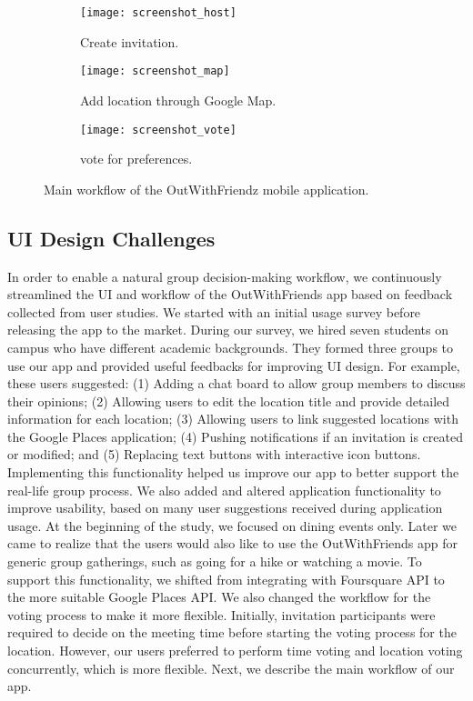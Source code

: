 \begin{figure}
\centering
\begin{subfigure}{.33\textwidth}
  \centering
  \texttt{[image: screenshot\_host]}
  \caption{Create invitation.}
  \label{fig:screenshot_host}
\end{subfigure}%
\begin{subfigure}{.33\textwidth}
  \centering
  \texttt{[image: screenshot\_map]}
  \caption{Add location through Google Map.}
  \label{fig:screenshot_map}
\end{subfigure}
\begin{subfigure}{.33\textwidth}
  \centering
  \texttt{[image: screenshot\_vote]}
  \caption{ vote for preferences.}
  \label{fig:screenshot_vote}
\end{subfigure}
\caption{Main workflow of the OutWithFriendz mobile application.}
\end{figure}

\subsection{UI Design Challenges}
In order to enable a natural group decision-making workflow, we continuously
streamlined the UI and workflow of the OutWithFriends app based on feedback
collected from user studies. We started with an initial usage survey
before releasing the app to the market. During our survey, we hired seven
students on campus who have different academic backgrounds. They formed three
groups to use our app and provided useful feedbacks for improving UI design.
For example, these users suggested: (1) Adding a chat board to allow group
members to discuss their opinions; (2) Allowing users to edit the location title
and provide detailed information for each location; (3) Allowing users to link
suggested locations with the Google Places application; (4) Pushing notifications
if an invitation is created or modified; and (5) Replacing text buttons with
interactive icon buttons. Implementing this functionality helped us improve our
app to better support the real-life group  process.
We also added and altered application functionality to improve usability, based
on many user suggestions received during application usage.
At the beginning of the study, we focused on dining events only. Later we came
to realize that the users would also like to use the OutWithFriends app for
generic group gatherings, such as going for a hike or watching a movie. To
support this functionality, we shifted from integrating with Foursquare API to the more
suitable Google Places API. We also changed the workflow for the voting process
to make it more flexible. Initially, invitation participants were required to
decide on the meeting time before starting the voting process for the location.
However, our users preferred to perform time voting and location voting
concurrently, which is more flexible. Next, we describe the main workflow of our app.

